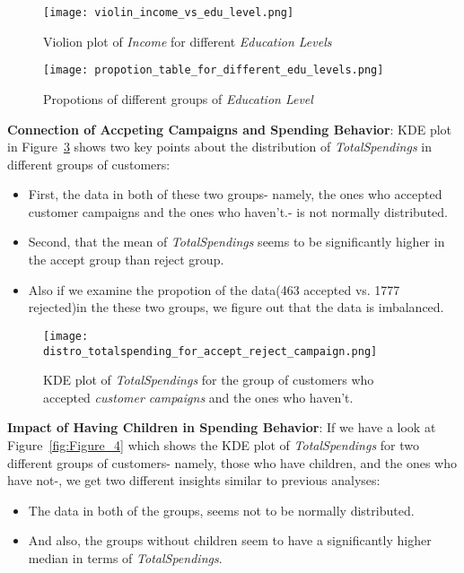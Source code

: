 \documentclass[a4paper,12pt]{article}
\begin{document}
\begin{figure}[H]
    \centering
    \texttt{[image: violin\_income\_vs\_edu\_level.png]}
    \caption{Violion plot of \textit{Income} for different \textit{Education Levels}}
    \label{fig:Figure_1}
\end{figure}

\begin{figure}[H]
    \centering
    \texttt{[image: propotion\_table\_for\_different\_edu\_levels.png]}
    \caption{Propotions of different groups of \textit{Education Level} }
    \label{fig:Figure_2}
\end{figure}


\noindent \textbf{Connection of Accpeting Campaigns and Spending Behavior}: KDE plot in Figure~\ref{fig:Figure_3} shows two key points about the distribution of \textit{TotalSpendings} in different groups of customers:
\begin{itemize}
    \item First, the data in both of these two groups- namely, the ones who accepted customer campaigns and the ones who haven't.- is not normally distributed.
    \item Second, that the mean of \textit{TotalSpendings} seems to be significantly higher in the accept group than reject group.
    \item Also if we examine the propotion of the data(463 accepted vs. 1777 rejected)in the these two groups, we figure out that the data is imbalanced.
\end{itemize}

\begin{figure}[H]
    \centering
    \texttt{[image: distro\_totalspending\_for\_accept\_reject\_campaign.png]}
    \caption{KDE plot of \textit{TotalSpendings} for the group of customers who accepted \textit{customer campaigns} and the ones who haven't.}
    \label{fig:Figure_3}
\end{figure}


\noindent \textbf{Impact of Having Children in Spending Behavior}: If we have a look at Figure~\ref{fig:Figure_4} which shows the KDE plot of \textit{TotalSpendings} for two different groups of customers- namely, 
those who have children, and the ones who have not-, we get two different insights similar to previous analyses:
\begin{itemize}
    \item The data in both of the groups, seems not to be normally distributed.
    \item And also, the groups without children seem to have a significantly higher median in terms of \textit{TotalSpendings}.
\end{itemize}
 
\end{document}
